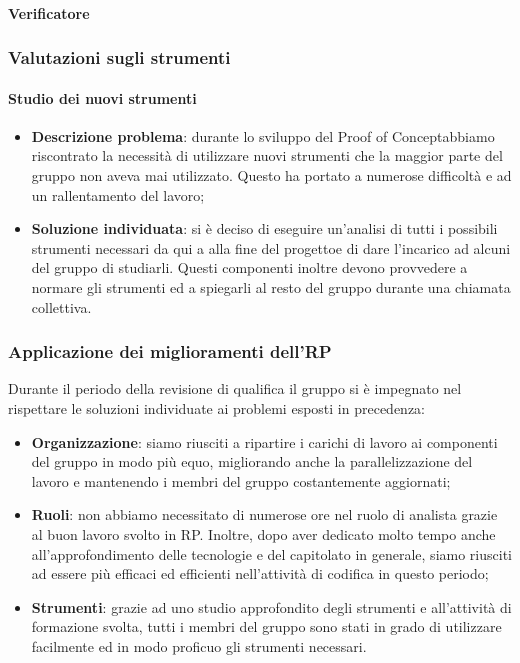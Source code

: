 			\paragraph{Verificatore}
		\subsubsection{Valutazioni sugli strumenti}
			\paragraph{Studio dei nuovi strumenti}
				\begin{itemize}
					\item \textbf{Descrizione problema}: durante lo sviluppo del Proof of Concept\glosp abbiamo riscontrato la necessità di utilizzare nuovi strumenti che la maggior parte del gruppo non aveva mai utilizzato. Questo ha portato a numerose difficoltà e ad un rallentamento del lavoro;
					\item \textbf{Soluzione individuata}: si è deciso di eseguire un'analisi di tutti i possibili strumenti necessari da qui a alla fine del progetto\glosp e di dare l'incarico ad alcuni del gruppo di studiarli. Questi componenti inoltre devono provvedere a normare gli strumenti ed a spiegarli al resto del gruppo durante una chiamata collettiva.
				\end{itemize}
		\subsubsection{Applicazione dei miglioramenti dell'RP}
		Durante il periodo della revisione di qualifica il gruppo si è impegnato nel rispettare le soluzioni individuate ai problemi esposti in precedenza:
		\begin{itemize}
			\item \textbf{Organizzazione}: siamo riusciti a ripartire i carichi di lavoro ai componenti del gruppo in modo più equo, migliorando anche la parallelizzazione del lavoro e mantenendo i membri del gruppo costantemente aggiornati;
			\item \textbf{Ruoli}: non abbiamo necessitato di numerose ore nel ruolo di analista grazie al buon lavoro svolto in RP. Inoltre, dopo aver dedicato molto tempo anche all'approfondimento delle tecnologie e del capitolato in generale, siamo riusciti ad essere più efficaci ed efficienti nell'attività di codifica in questo periodo;
			\item \textbf{Strumenti}: grazie ad uno studio approfondito degli strumenti e all'attività di formazione svolta, tutti i membri del gruppo sono stati in grado di utilizzare facilmente ed in modo proficuo gli strumenti necessari.
		\end{itemize}
